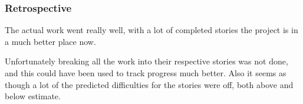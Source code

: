 \subsubsection{Retrospective}
The actual work went really well, with a lot of completed stories the project is in a much better place now.

Unfortunately breaking all the work into their respective stories was not done, and this could have been used to track progress much better. Also it seems as though a lot of the predicted difficulties for the stories were off, both above and below estimate.
\newpage
